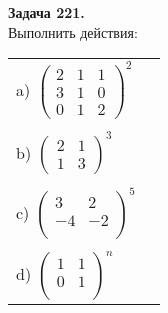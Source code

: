 \documentclass[a4paper, 12pt]{article}
\newenvironment{problem}[2][Задача]
    { \begin{mdframed}[backgroundcolor=gray!10] \textbf{#1 #2.} \\}
    {  \end{mdframed}}
\begin{document}
\begin{problem}{221}
Выполнить действия: \\
\noindent
\begin{tabular}{ll}
a)
$
\left(
\begin{array}{rrr}
2 & 1 & 1\\
3 & 1 & 0\\
0 & 1 & 2
\end{array}
\right)^2
$
\\
\\
b)
$
\left(
\begin{array}{rr}
2 & 1 \\
1 & 3
\end{array}
\right)^3
$
\\
\\
c)
$\left(
\begin{array}{rr}
3 & 2 \\
-4 & -2 \\
\end{array}
\right)^5
$
\\
\\
d)
$
\left(
\begin{array}{rr}
1 & 1 \\
0 & 1 \\
\end{array}
\right)^n
$
\\
\end{tabular}

\end{problem}
\end{document}
